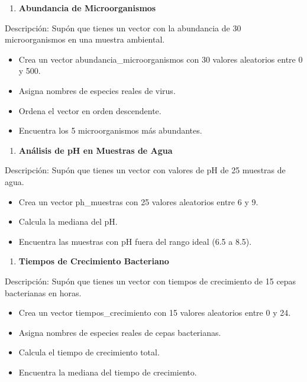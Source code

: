 \documentclass[
]{book}
\providecommand{\tightlist}{%
  \setlength{\itemsep}{0pt}\setlength{\parskip}{0pt}}
\begin{document}
\begin{enumerate}
\def\labelenumi{\arabic{enumi}.}
\setcounter{enumi}{3}
\tightlist
\item
  \textbf{Abundancia de Microorganismos}
\end{enumerate}

Descripción: Supón que tienes un vector con la abundancia de 30 microorganismos en una muestra ambiental.

\begin{itemize}
\tightlist
\item
  Crea un vector abundancia\_microorganismos con 30 valores aleatorios entre 0 y 500.
\item
  Asigna nombres de especies reales de virus.
\item
  Ordena el vector en orden descendente.
\item
  Encuentra los 5 microorganismos más abundantes.
\end{itemize}

\begin{enumerate}
\def\labelenumi{\arabic{enumi}.}
\setcounter{enumi}{4}
\tightlist
\item
  \textbf{Análisis de pH en Muestras de Agua}
\end{enumerate}

Descripción: Supón que tienes un vector con valores de pH de 25 muestras de agua.

\begin{itemize}
\tightlist
\item
  Crea un vector ph\_muestras con 25 valores aleatorios entre 6 y 9.
\item
  Calcula la mediana del pH.
\item
  Encuentra las muestras con pH fuera del rango ideal (6.5 a 8.5).
\end{itemize}

\begin{enumerate}
\def\labelenumi{\arabic{enumi}.}
\setcounter{enumi}{5}
\tightlist
\item
  \textbf{Tiempos de Crecimiento Bacteriano}
\end{enumerate}

Descripción: Supón que tienes un vector con tiempos de crecimiento de 15 cepas bacterianas en horas.

\begin{itemize}
\tightlist
\item
  Crea un vector tiempos\_crecimiento con 15 valores aleatorios entre 0 y 24.
\item
  Asigna nombres de especies reales de cepas bacterianas.
\item
  Calcula el tiempo de crecimiento total.
\item
  Encuentra la mediana del tiempo de crecimiento.
\end{itemize}
\end{document}
